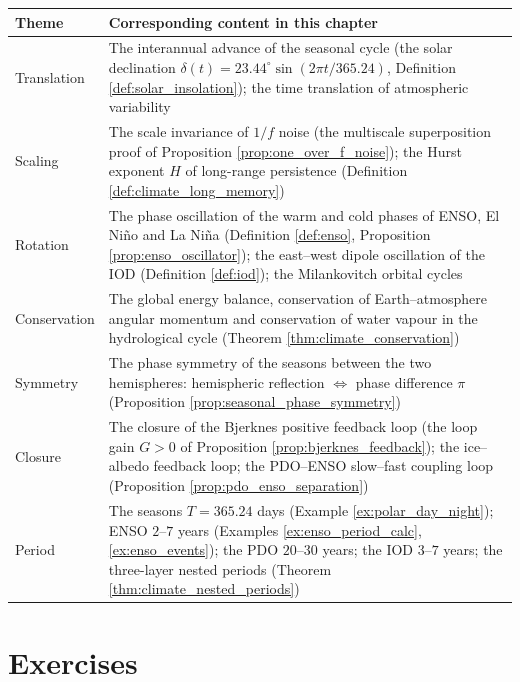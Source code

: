 \begin{center}
\begin{tabular}{>{\centering\arraybackslash}p{2.8cm}>{\centering\arraybackslash}p{9.9cm}}
\toprule
Theme & Corresponding content in this chapter \\
\midrule
Translation & The interannual advance of the seasonal cycle (the solar declination $\delta(t) = 23.44^\circ \sin(2\pi t/365.24)$, Definition \ref{def:solar_insolation}); the time translation of atmospheric variability \\
Scaling & The scale invariance of $1/f$ noise (the multiscale superposition proof of Proposition \ref{prop:one_over_f_noise}); the Hurst exponent $H$ of long-range persistence (Definition \ref{def:climate_long_memory}) \\
Rotation & The phase oscillation of the warm and cold phases of ENSO, El Niño and La Niña (Definition \ref{def:enso}, Proposition \ref{prop:enso_oscillator}); the east--west dipole oscillation of the IOD (Definition \ref{def:iod}); the Milankovitch orbital cycles \\
Conservation & The global energy balance, conservation of Earth--atmosphere angular momentum and conservation of water vapour in the hydrological cycle (Theorem \ref{thm:climate_conservation}) \\
Symmetry & The phase symmetry of the seasons between the two hemispheres: hemispheric reflection $\Leftrightarrow$ phase difference $\pi$ (Proposition \ref{prop:seasonal_phase_symmetry}) \\
Closure & The closure of the Bjerknes positive feedback loop (the loop gain $G>0$ of Proposition \ref{prop:bjerknes_feedback}); the ice--albedo feedback loop; the PDO--ENSO slow--fast coupling loop (Proposition \ref{prop:pdo_enso_separation}) \\
Period & The seasons $T=365.24$ days (Example \ref{ex:polar_day_night}); ENSO $2$--$7$ years (Examples \ref{ex:enso_period_calc}, \ref{ex:enso_events}); the PDO $20$--$30$ years; the IOD $3$--$7$ years; the three-layer nested periods (Theorem \ref{thm:climate_nested_periods}) \\
\bottomrule
\end{tabular}
\end{center}

\section*{Exercises}


